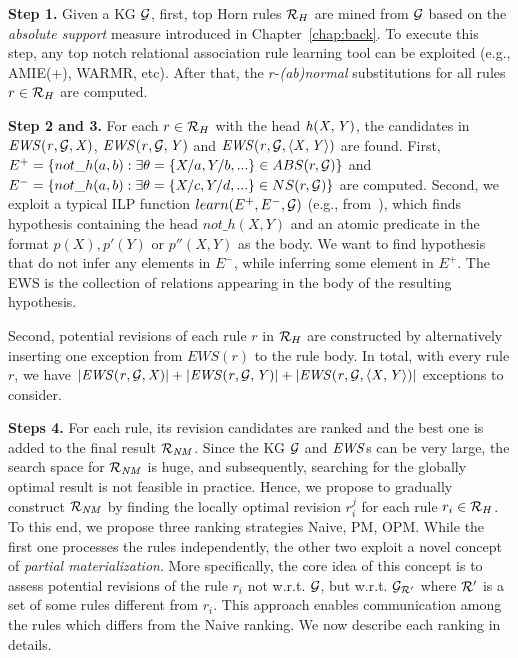 \noindent \textbf{Step 1.} Given a KG $\mathcal{G}$, first, top Horn rules $\mathcal{R}_H$ are mined from $\mathcal{G}$ based on the \textit{absolute support} measure introduced in Chapter~\ref{chap:back}. To execute this step, any top notch relational association rule learning tool can be exploited (e.g., AMIE(+), WARMR, etc). After that, the $r$-\emph{(ab)normal} substitutions for all rules $r\in \mathcal{R}_H$ are computed.
\smallskip


\noindent \textbf{Step 2 and 3.} For each $r \in \mathcal{R}_H$ with the head $\mathit{h(X,Y)}$, the candidates in $\mathit{EWS(r,\mathcal{G},X)}$, $\mathit{EWS(r,\mathcal{G},Y)}$ and $\mathit{EWS(r,\mathcal{G},\langle X,Y\rangle)}$ are found. First, $E^+ = \{not\_h(a, b): \exists \theta = \{X/a, Y/b, ... \} \in ABS(r, \mathcal{G})\}$ and $E^- = \{not\_h(a, b): \exists \theta = \{X/c, Y/d, ... \} \in NS(r, \mathcal{G})\}$ are computed. Second, we exploit a typical ILP function $learn(E^+, E^-, \mathcal{G})$ (e.g., from~\cite{ref55}), which finds hypothesis containing the head $not\_h(X, Y)$ and an atomic predicate in the format $p(X), p'(Y)$ or $p''(X, Y)$ as the body. We want to find hypothesis that do not infer any elements in $E^-$, while inferring some element in $E^+$. The EWS is the collection of relations appearing in the body of the resulting hypothesis.

Second, potential revisions of each rule $r$ in $\mathcal{R}_H$ are constructed by alternatively inserting one exception from $EWS(r)$ to the rule body. In total, with every rule $r$, we have $|\mathit{EWS(r,\mathcal{G},X)}|+|\mathit{EWS(r,\mathcal{G},Y)}|+|\mathit{EWS(r,\mathcal{G},\langle X,Y\rangle)}|$ exceptions to consider.

\smallskip

\noindent \textbf{Steps 4.} For each rule, its revision candidates are ranked and the best one is added to the final result $\mathcal{R}_{\mathit{NM}}$. Since the KG $\mathcal{G}$ and $\mathit{EWS}$s can be very large, the search space for $\mathcal{R}_{\mathit{NM}}$ is huge, and subsequently, searching for the globally optimal result is not feasible in practice. Hence, we propose to gradually construct $\mathcal{R}_{\mathit{NM}}$ by finding the locally optimal revision $r_i^{j}$ for each rule $r_i \in \mathcal{R}_{H}$. To this end, we propose three ranking strategies Naive, PM, OPM. While the first one processes the rules independently, the other two exploit a novel concept of \emph{partial materialization}. More specifically, the core idea of this concept is to assess potential revisions of the rule $r_i$ not w.r.t. $\mathcal{G}$, but w.r.t. $\mathcal{G}_{\mathcal{R}'}$ where $\mathcal{R}'$ is a set of some rules different from $r_i$. This approach enables communication among the rules which differs from the Naive ranking. We now describe each ranking in details.

